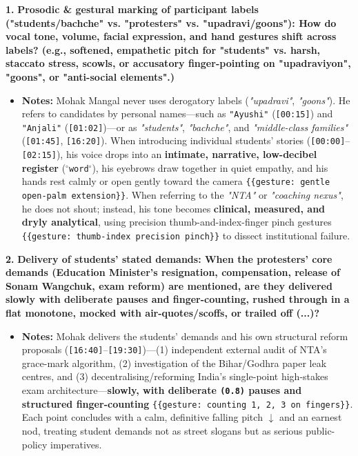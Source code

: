 \documentclass[10pt,a4paper]{article}
\begin{document}
\noindent\textbf{1.} \textbf{Prosodic \& gestural marking of participant labels ("students/bachche" vs. "protesters" vs. "upadravi/goons"): How do vocal tone, volume, facial expression, and hand gestures shift across labels? (e.g., softened, empathetic pitch for "students" vs. harsh, staccato stress, scowls, or accusatory finger-pointing on "upadraviyon", "goons", or "anti-social elements".)}\par\smallskip
\begin{itemize}
  \item \textbf{Notes:}
Mohak Mangal never uses derogatory labels (\textit{"upadravi"}, \textit{"goons"}). He refers to candidates by personal names---such as \texttt{"Ayushi"} (\texttt{[00:15]}) and \texttt{"Anjali"} (\texttt{[01:02]})---or as \textit{"students"}, \textit{"bachche"}, and \textit{"middle-class families"} (\texttt{[01:45]}, \texttt{[16:20]}). When introducing individual students' stories (\texttt{[00:00]}--\texttt{[02:15]}), his voice drops into an \textbf{intimate, narrative, low-decibel register} (\texttt{$^\circ$word$^\circ$}), his eyebrows draw together in quiet empathy, and his hands rest calmly or open gently toward the camera \texttt{\{\{gesture: gentle open-palm extension\}\}}. When referring to the \textit{"NTA"} or \textit{"coaching nexus"}, he does not shout; instead, his tone becomes \textbf{clinical, measured, and dryly analytical}, using precision thumb-and-index-finger pinch gestures \texttt{\{\{gesture: thumb-index precision pinch\}\}} to dissect institutional failure.\par\smallskip
\end{itemize}

\noindent\textbf{2.} \textbf{Delivery of students' stated demands: When the protesters' core demands (Education Minister's resignation, compensation, release of Sonam Wangchuk, exam reform) are mentioned, are they delivered slowly with deliberate pauses and finger-counting, rushed through in a flat monotone, mocked with air-quotes/scoffs, or trailed off (...)?}\par\smallskip
\begin{itemize}
  \item \textbf{Notes:}
Mohak delivers the students' demands and his own structural reform proposals (\texttt{[16:40]}--\texttt{[19:30]})---(1) independent external audit of NTA's grace-mark algorithm, (2) investigation of the Bihar/Godhra paper leak centres, and (3) decentralising/reforming India's single-point high-stakes exam architecture---\textbf{slowly, with deliberate \texttt{(0.8)} pauses and structured finger-counting} \texttt{\{\{gesture: counting 1, 2, 3 on fingers\}\}}. Each point concludes with a calm, definitive falling pitch \texttt{$\downarrow$} and an earnest nod, treating student demands not as street slogans but as serious public-policy imperatives.\par\smallskip
\end{itemize}
\end{document}
